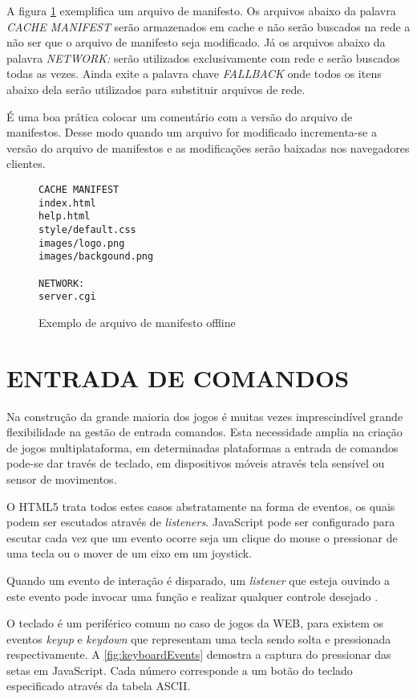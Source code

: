 A figura \ref{fig:offline} exemplifica um arquivo de manifesto. Os
arquivos abaixo da palavra \textit{CACHE MANIFEST} serão armazenados
em cache e não serão buscados na rede a não ser que o arquivo
de manifesto seja modificado. Já os arquivos abaixo da palavra
\textit{NETWORK:} serão utilizados exclusivamente com rede e serão
buscados todas as vezes. Ainda exite a palavra chave \textit{FALLBACK}
onde todos os itens abaixo dela serão utilizados para substituir
arquivos de rede.

É uma boa prática colocar um comentário com a versão do arquivo de
manifestos. Desse modo quando um arquivo for modificado incrementa-se a
versão do arquivo de manifestos e as modificações serão baixadas nos
navegadores clientes.

\begin{figure}[H]
\centering
\begin{verbatim}
CACHE MANIFEST
index.html
help.html
style/default.css
images/logo.png
images/backgound.png

NETWORK:
server.cgi
\end{verbatim}
\caption{Exemplo de arquivo de manifesto offline}
\label{fig:offline}
\end{figure}

\section{ENTRADA DE COMANDOS}
Na construção da grande maioria dos jogos é muitas vezes
imprescindível grande flexibilidade na gestão de entrada comandos.
Esta necessidade amplia na criação de jogos multiplataforma, em
determinadas plataformas a entrada de comandos pode-se dar través de
teclado, em dispositivos móveis através tela sensível ou sensor de
movimentos.

O HTML5 trata todos estes casos abstratamente na forma de eventos, os
quais podem ser escutados através de \textit{listeners}. JavaScript
pode ser configurado para escutar cada vez que um evento ocorre seja um
clique do mouse o pressionar de uma tecla ou o mover de um eixo em um
joystick.

Quando um evento de interação é disparado, um \textit{listener}
que esteja ouvindo a este evento pode invocar uma função e realizar
qualquer controle desejado \autocite{buildingHtml5Game}.

O teclado é um periférico comum no caso de jogos da WEB, para existem
os eventos \textit{keyup} e \textit{keydown} que representam uma tecla
sendo solta e pressionada respectivamente. A \ref{fig:keyboardEvents}
demostra a captura do pressionar das setas em JavaScript. Cada
número corresponde a um botão do teclado especificado através da tabela ASCII.


